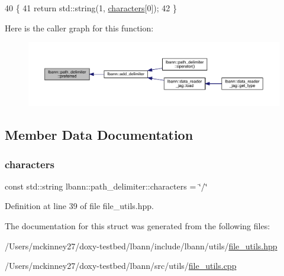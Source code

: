 \begin{DoxyCode}
40                                \{
41     \textcolor{keywordflow}{return} std::string(1, \hyperlink{structlbann_1_1path__delimiter_ac64e71aff928b202c0c9e880ea641315}{characters}[0]);
42   \}
\end{DoxyCode}
Here is the caller graph for this function\+:\nopagebreak
\begin{figure}[H]
\begin{center}
\leavevmode
\includegraphics[width=350pt]{structlbann_1_1path__delimiter_a4f3bb346e47a66b16419125b1485e2ef_icgraph}
\end{center}
\end{figure}


\subsection{Member Data Documentation}
\mbox{\label{structlbann_1_1path__delimiter_ac64e71aff928b202c0c9e880ea641315}} 
\subsubsection{\texorpdfstring{characters}{characters}}
{\footnotesize\ttfamily const std\+::string lbann\+::path\+\_\+delimiter\+::characters = \char`\"{}/\char`\"{}\hspace{0.3cm}{\ttfamily [static]}}



Definition at line 39 of file file\+\_\+utils.\+hpp.



The documentation for this struct was generated from the following files\+:\begin{DoxyCompactItemize}
\item 
/\+Users/mckinney27/doxy-\/testbed/lbann/include/lbann/utils/\hyperlink{file__utils_8hpp}{file\+\_\+utils.\+hpp}\item 
/\+Users/mckinney27/doxy-\/testbed/lbann/src/utils/\hyperlink{file__utils_8cpp}{file\+\_\+utils.\+cpp}\end{DoxyCompactItemize}
